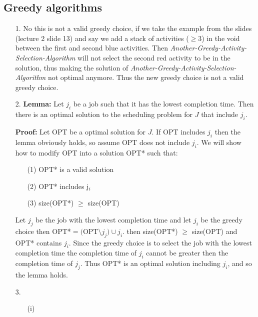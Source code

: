 \documentclass{article}
\begin{document}
\subsection*{Greedy algorithms}
\begin{itemize}
\item[1.] No this is not a valid greedy choice, if we take the example from the slides (lecture 2 slide 13) and say we add a stack of activities ($\ge 3$) in the void between the first and second blue activities. Then \emph{Another-Greedy-Activity-Selection-Algorithm} will not select the second red activity to be in the solution, thus making the solution of \emph{Another-Greedy-Activity-Selection-Algorithm} not optimal anymore. Thus the new greedy choice is not a valid greedy choice.

\item[2.] \textbf{Lemma:}
Let $j_i$ be a job such that it has the lowest completion time. Then there is an optimal solution to the scheduling problem for $J$ that include $j_i$.


\textbf{Proof:} Let OPT be a optimal solution for $J$. If OPT includes $j_i$ then the lemma obviously holds, so assume OPT does not include $j_i$. We will show how to modify OPT into a solution OPT* such that:

\begin{itemize}
\item[(1)] OPT* is a valid solution
\item[(2)] OPT* includes j$_i$
\item[(3)] size(OPT*) $\ge$ size(OPT) 
\end{itemize}


Let $j_j$ be the job with the lowest completion time and let $j_i$ be the greedy choice then OPT*$=($OPT$\setminus j_j) \cup j_i$. then size(OPT*) $\ge$ size(OPT) and OPT* contains $j_i$. Since the greedy choice is to select the job with the lowest completion time the completion time of $j_i$ cannot be greater then the completion time of $j_j$.
Thus OPT* is an optimal solution including $j_i$, and so the lemma holds.



\item[3.]
\begin{itemize}

\item[(i)] \begin{algorithmic}[1]

\ENDIF
\ENDFOR
{}
\ENDWHILE
{}
\ENDIF
\ENDFOR
{}
\end{algorithmic}


\end{itemize}
\end{itemize}
\end{document}
